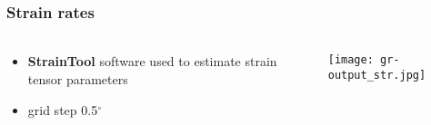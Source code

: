 %
%  
%
%
% 	  
%
%
%        

\begin{frame}
  \frametitle{Strain rates}
  \framesubtitle{}
  \label{}
\begin{columns}[T]
  \begin{column}{.3\textwidth}
    \begin{itemize}\setlength\itemsep{1em}
      \item \textbf{StrainTool} software used to estimate strain tensor parameters \citep{straintool}
      \item grid step 0.5$^{\circ}$
    \end{itemize}
  \end{column}
  \begin{column}{.7\textwidth}
    \begin{center}
    \vskip-1.2cm
      \texttt{[image: gr-output\_str.jpg]}
    \end{center}
  \end{column}
\end{columns}
\end{frame}
\note{}

